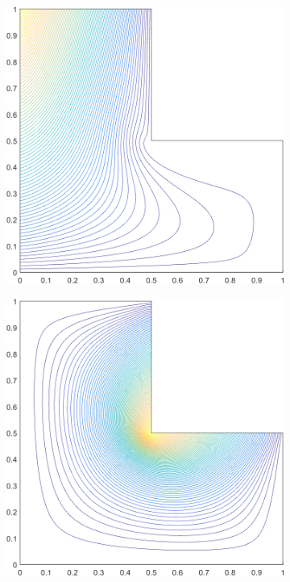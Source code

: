 \begin{figure}
{\begin{subfigure}[b]{0.375\textwidth}
	\end{subfigure}
}
\vspace{3mm}
{
	\begin{subfigure}[b]{0.375\textwidth}
		\centering
		\includegraphics[width=\textwidth]{figures/sec_BF/L-domain_MAXENT1_contour_b6.png}
	\end{subfigure}
	\hspace{1.5cm}
	\begin{subfigure}[b]{0.375\textwidth}
		\centering
		\includegraphics[width=\textwidth]{figures/sec_BF/L-domain_MAXENT1_contour_b4.png}

\end{subfigure}}
\end{figure}
